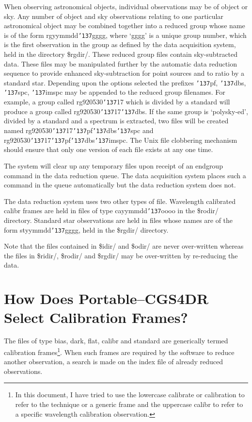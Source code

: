 \documentclass[a4paper]{book}
\renewcommand{\_}{{\tt\char'137}}
\begin{document}
When observing astronomical objects, individual observations may be of
{\sc object} or {\sc sky}. Any number of {\sc object} and {\sc sky}
observations relating to one particular astronomical object may be
combined together into a reduced group whose name is of the form
rgyymmdd\_gggg, where `gggg' is a unique group number, which is the first
observation in the group as defined by the data acquisition system, held
in the directory {\sc \$rgdir/}. These reduced group files contain
sky-subtracted data. These files may be manipulated further by the
automatic data reduction sequence to provide enhanced sky-subtraction for
point sources and to ratio by a standard star.  Depending upon the options
selected the prefixes \_pf, \_dbs, \_spc, \_imspc may be appended to the
reduced group filenames. For example, a group called rg920530\_17 which is
divided by a standard will produce a group called rg920530\_17\_dbs. If
the same group is `polysky-ed', divided by a standard and a spectrum is
extracted, two files will be created named rg920530\_17\_pf\_dbs\_spc and
rg920530\_17\_pf\_dbs\_imspc. The Unix file clobbering mechanism should
ensure that only one version of each file exists at any one time. 

The system will clear up any temporary files upon receipt of an {\sc
endgroup} command in the data reduction queue. The data acquisition system
places such a command in the queue automatically but the data reduction
system does not. 

The data reduction system uses two other types of file. Wavelength
calibrated {\sc calibr} frames are held in files of type cayymmdd\_oooo in
the {\sc \$rodir/} directory. Standard star observations are held in files
whose names are of the form styymmdd\_gggg, held in the {\sc \$rgdir/}
directory. 

Note that the files contained in {\sc \$idir/} and {\sc \$odir/} are never
over-written whereas the files in {\sc \$ridir/}, {\sc \$rodir/} and {\sc
\$rgdir/} may be over-written by re-reducing the data. 

\section{How Does Portable--CGS4DR Select Calibration Frames?}
The files of type {\sc bias}, {\sc dark}, {\sc flat}, {\sc calibr} and
{\sc standard} are generically termed calibration frames\footnote[2]{In
this document, I have tried to use the lowercase calibrate or calibration
to refer to the technique or a generic frame and the uppercase {\sc
calibr} to refer to a specific wavelength calibration observation.}. When
such frames are required by the software to reduce another observation, a
search is made on the index file of already reduced observations. 
\end{document}
